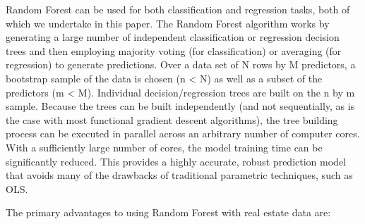 \documentclass[12pt,]{article}
\begin{document}
Random Forest can be used for both classification and regression tasks,
both of which we undertake in this paper. The Random Forest algorithm
works by generating a large number of independent classification or
regression decision trees and then employing majority voting (for
classification) or averaging (for regression) to generate predictions.
Over a data set of N rows by M predictors, a bootstrap sample of the
data is chosen (n \textless{} N) as well as a subset of the predictors
(m \textless{} M). Individual decision/regression trees are built on the
n by m sample. Because the trees can be built independently (and not
sequentially, as is the case with most functional gradient descent
algorithms), the tree building process can be executed in parallel
across an arbitrary number of computer cores. With a sufficiently large
number of cores, the model training time can be significantly reduced.
This provides a highly accurate, robust prediction model that avoids
many of the drawbacks of traditional parametric techniques, such as OLS.

The primary advantages to using Random Forest with real estate data are:
\end{document}

